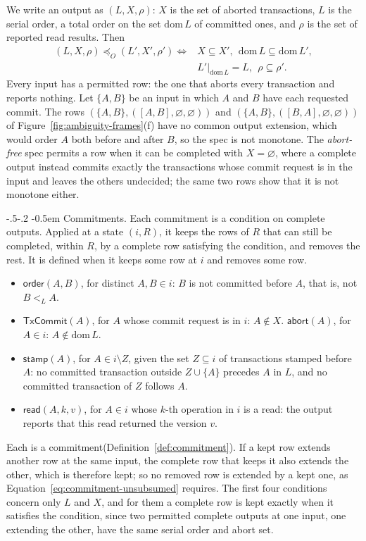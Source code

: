 \documentclass[sigconf]{cidr-2027}
\makeatletter
\theoremstyle{remark}
\renewcommand\paragraph{\@startsection{paragraph}{4}{\z@}%
  {-.5\baselineskip \@plus -2\p@ \@minus -.2\p@}%
  {-0.5em}%
  {\normalfont\bfseries}}
\newcommand{\OutputOrd}{\preceq_O}
\newcommand{\commitment}{commitment\xspace}
\newcommand{\Commitments}{Commitments\xspace}
\newcommand{\outrel}{extends\xspace}          %
\newcommand{\outrelpart}{extending\xspace}    %
\newcommand{\outrelpast}{extended\xspace}     %
\newcommand{\outnoun}{output extension\xspace}%
\makeatother
\begin{document}
\color{blue!70!black}We write an output as $(L,X,\rho)$: $X$ is the set of aborted transactions, $L$
is the serial order, a total order on the set $\mathrm{dom}\,L$ of committed
ones, and $\rho$ is the set of reported read results.  Then
\[
  \begin{aligned}
  (L,X,\rho)\OutputOrd(L',X',\rho')
  \iff{}& X\subseteq X',\ \ \mathrm{dom}\,L\subseteq\mathrm{dom}\,L',\\
         & L'|_{\mathrm{dom}\,L}=L,\ \ \rho\subseteq\rho'.
  \end{aligned}
\]
Every input has a permitted row: the one that aborts every transaction and
reports nothing.  Let $\{A,B\}$ be an input in which $A$ and $B$ have each
requested commit.  The rows $(\{A,B\},([A,B],\varnothing,\varnothing))$ and
$(\{A,B\},([B,A],\varnothing,\varnothing))$ of
Figure~\ref{fig:ambiguity-frames}(f) have no common \outnoun, which would order
$A$ both before and after $B$, so the spec is not monotone.  The
\emph{abort-free} spec permits a row when it can be completed with
$X=\varnothing$, where a complete output instead commits exactly the transactions
whose commit request is in the input and leaves the others undecided; the same
two rows show that it is not monotone either.\color{black}

\paragraph{\Commitments.}
Each \commitment is a condition on complete outputs.  Applied at a state
$(i,R)$, it keeps the rows of $R$ that can still be completed, within $R$, by a
complete row satisfying the condition, and removes the rest.  It is defined
when it keeps some row at $i$ and removes some row.
\begin{itemize}
  \item $\mathsf{order}(A,B)$, for distinct $A,B\in i$: $B$ is not committed
        before $A$, that is, not $B<_L A$.
  \item $\mathsf{TxCommit}(A)$, for $A$ whose commit request is in $i$:
        $A\notin X$.\quad
        $\mathsf{abort}(A)$, for $A\in i$: $A\notin\mathrm{dom}\,L$.
  \item $\mathsf{stamp}(A)$, for $A\in i\setminus Z$, given the set $Z\subseteq
        i$ of transactions stamped before $A$: no committed transaction outside
        $Z\cup\{A\}$ precedes $A$ in $L$, and no committed transaction of $Z$
        follows $A$.
  \item $\mathsf{read}(A,k,v)$, for $A\in i$ whose $k$-th operation in $i$ is a
        read: the output reports that this read returned the version $v$.
\end{itemize}
Each is a \commitment (Definition~\ref{def:commitment}).  If a kept row \outrel
another row at the same input, the complete row that keeps it also
\outrel the other, which is therefore kept; so no removed row is \outrelpast by
a kept one, as Equation~\ref{eq:commitment-unsubsumed} requires.  The first four
conditions concern only $L$ and $X$, and for them a complete row is kept
exactly when it satisfies the condition, since two permitted complete outputs
at one input, one \outrelpart the other, have the same serial order and abort
set.
\end{document}
